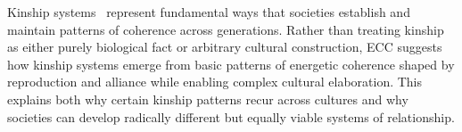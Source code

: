 Kinship systems~ represent fundamental ways that societies establish and maintain patterns of coherence across generations. Rather than treating kinship as either purely biological fact or arbitrary cultural construction, ECC suggests how kinship systems emerge from basic patterns of energetic coherence shaped by reproduction and alliance while enabling complex cultural elaboration. This explains both why certain kinship patterns recur across cultures and why societies can develop radically different but equally viable systems of relationship.









